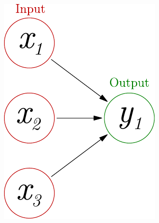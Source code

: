 \documentclass{beamer}
\begin{document}
\begin{frame}
\begin{columns}[T]
\begin{column}{.5\textwidth}
\begin{figure}
 \includegraphics[width=0.9\linewidth]{./fig/perceptron.pdf}
\end{figure}
    \end{column}
  \end{columns}
\end{frame}
\end{document}
